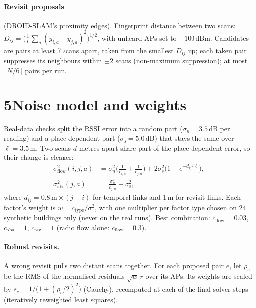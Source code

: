 \documentclass[11pt]{article}
\begin{document}
\paragraph{Revisit proposals} (DROID-SLAM's proximity edges). Fingerprint distance between two scans:
$D_{ij}=\big(\frac1L\sum_a(\tilde y_{i,a}-\tilde y_{j,a})^2\big)^{1/2}$, with unheard APs set to $-100$\,dBm.
Candidates are pairs at least 7 scans apart, taken from the smallest $D_{ij}$ up; each taken pair suppresses
its neighbours within $\pm2$ scans (non-maximum suppression); at most $\lfloor N/6\rfloor$ pairs per run.

\section*{5\quad Noise model and weights}
Real-data checks split the RSSI error into a random part ($\sigma_n=3.5$\,dB per reading) and a
place-dependent part ($\sigma_s=5.0$\,dB) that stays the same over $\ell=3.5$\,m. Two scans $d$ metres apart
share part of the place-dependent error, so their change is cleaner:
\begin{align}
\sigma^2_{\text{flow}}(i,j,a)&=\sigma_n^2\Big(\frac{1}{c_{i,a}}+\frac{1}{c_{j,a}}\Big)+2\sigma_s^2\big(1-e^{-d_{ij}/\ell}\big),\\
\sigma^2_{\text{abs}}(j,a)&=\frac{\sigma_n^2}{c_{j,a}}+\sigma_s^2 ,
\end{align}
where $d_{ij}=0.8\,\text{m}\times(j-i)$ for temporal links and 1\,m for revisit links. Each factor's weight is $w=c_{\text{type}}/\sigma^2$, with one multiplier per factor type chosen on 24
synthetic buildings only (never on the real runs). Best combination: $c_{\text{flow}}=0.03$,
$c_{\text{abs}}=1$, $c_{\text{rev}}=1$ (radio flow alone: $c_{\text{flow}}=0.3$).

\paragraph{Robust revisits.} A wrong revisit pulls two distant scans together. For each proposed pair $e$,
let $\rho_e$ be the RMS of the normalised residuals $\sqrt{w}\,r$ over its APs. Its weights are scaled by
$s_e=1/\big(1+(\rho_e/2)^2\big)$ (Cauchy), recomputed at each of the final solver steps (iteratively
reweighted least squares).
\end{document}
